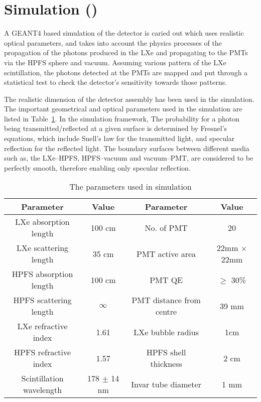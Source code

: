 \section{Simulation ()}
\label{sec:sim}
A GEANT4 based simulation of the detector is caried out which uses realistic optical parameters, 
and takes into account the physics processes of the propagation of the photons produced in the LXe 
and propagating to the PMTs via the HPFS sphere and vacuum. Assuming various pattern of the LXe 
scintillation, the photons detected at the PMTs are mapped and put through a statistical test to 
check the detector's sensitivity towards those patterns.

The realistic dimension of the detector assembly has been used in the simulation. The important 
geometrical and optical parameters used in the simulation are listed in Table~\ref{tab:OptPar}. 
In the simulation 
framework, The probability for a photon being transmitted/reflected at a given surface is 
determined by Fresnel’s equations, which include Snell’s law for the transmitted light, 
and specular reflection for the reflected light. The boundary surfaces between different media
such as, the LXe--HPFS, HPFS--vacuum and vacuum--PMT, are considered to be perfectly smooth, 
therefore enabling only specular reflection.

\begin{table}[h]
  \centering
  \caption{The parameters used in simulation}
  \label{tab:OptPar}
  \begin{tabular}{|c c||c c|}
  \hline
  Parameter & Value & Parameter & Value \\
  \hline
  LXe absorption length & 100 cm & No. of PMT & 20\\
  LXe scattering length & 35 cm & PMT active area & 22mm $\times$ 22mm\\
  HPFS absorption length & 100 cm & PMT QE & $\geq$ 30\% \\
  HPFS scattering length & $\infty$ & PMT distance from centre & 39 mm\\
  LXe refractive index & 1.61 & LXe bubble radius & 1cm\\
  HPFS refractive index & 1.57 & HPFS shell thickness & 2 cm \\
  Scintillation wavelength & 178 $\pm$ 14 nm & Invar tube diameter & 1 mm\\
  \hline
 \end{tabular}
\end{table}

